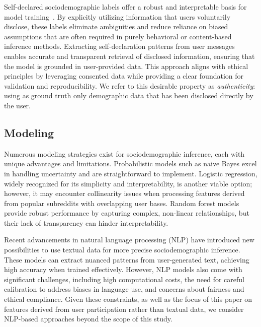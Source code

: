 Self-declared sociodemographic labels offer a robust and interpretable basis for model training~\cite{beller2014ma}.
By explicitly utilizing information that users voluntarily disclose, these labels eliminate ambiguities and reduce reliance on biased assumptions that are often required in purely behavioral or content-based inference methods.
Extracting self-declaration patterns from user messages enables accurate and transparent retrieval of disclosed information, ensuring that the model is grounded in user-provided data.
This approach aligns with ethical principles by leveraging consented data while providing a clear foundation for validation and reproducibility.
We refer to this desirable property as \emph{authenticity}: using as ground truth only demographic data that has been disclosed directly by the user.

\subsection{Modeling}

Numerous modeling strategies exist for sociodemographic inference, each with unique advantages and limitations.
Probabilistic models such as naive Bayes excel in handling uncertainty and are straightforward to implement.
Logistic regression, widely recognized for its simplicity and interpretability, is another viable option; however, it may encounter collinearity issues when processing features derived from popular subreddits with overlapping user bases.
Random forest models provide robust performance by capturing complex, non-linear relationships, but their lack of transparency can hinder interpretability.

Recent advancements in natural language processing (NLP) have introduced new possibilities to use textual data for more precise sociodemographic inference.
These models can extract nuanced patterns from user-generated text, achieving high accuracy when trained effectively.
However, NLP models also come with significant challenges, including high computational costs, the need for careful calibration to address biases in language use, and concerns about fairness and ethical compliance.
Given these constraints, as well as the focus of this paper on features derived from user participation rather than textual data, we consider NLP-based approaches beyond the scope of this study.

